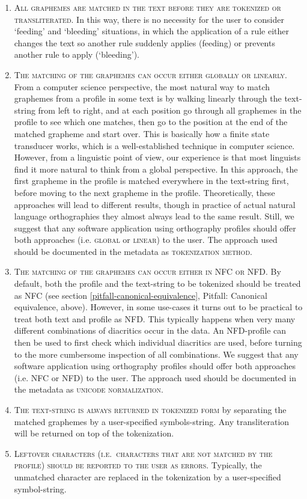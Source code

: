 \begin{enumerate}
	\def\labelenumi{\arabic{enumi}.} \item \textsc{All graphemes are matched
	in the text before they are tokenized or transliterated}. In this way,
	there is no necessity for the user to consider `feeding' and `bleeding'
	situations, in which the application of a rule either changes the text
	so another rule suddenly applies (feeding) or prevents another rule to
	apply (`bleeding').  \item \textsc{The matching of the graphemes can
	occur either globally or linearly. }From a computer science perspective,
	the most natural way to match graphemes from a profile in some text is
	by walking linearly through the text-string from left to right, and at
	each position go through all graphemes in the profile to see which one
	matches, then go to the position at the end of the matched grapheme and
	start over. This is basically how a finite state transducer works, which
	is a well-established technique in computer science. However, from a
	linguistic point of view, our experience is that most linguists find it
	more natural to think from a global perspective. In this approach, the
	first grapheme in the profile is matched everywhere in the text-string
	first, before moving to the next grapheme in the profile. Theoretically,
	these approaches will lead to different results, though in practice of
	actual natural language orthographies they almost always lead to the
	same result. Still, we suggest that any software application using
	orthography profiles should offer both approaches (i.e. \textsc{global}
	or \textsc{linear}) to the user. The approach used should be documented
	in the metadata as \textsc{tokenization method}.  \item \textsc{The
	matching of the graphemes can occur either in NFC or NFD. }By default,
	both the profile and the text-string to be tokenized should be treated
	as NFC (see section \ref{pitfall-canonical-equivalence}, Pitfall:
	Canonical equivalence, above). However, in some use-cases it turns out
	to be practical to treat both text and profile as NFD. This typically
	happens when very many different combinations of diacritics occur in the
	data. An NFD-profile can then be used to first check which individual
	diacritics are used, before turning to the more cumbersome inspection of
	all combinations. We suggest that any software application using
	orthography profiles should offer both approaches (i.e. \textsc{NFC} or
	\textsc{NFD}) to the user. The approach used should be documented in the
	metadata as \textsc{unicode normalization}.  \item \textsc{The
	text-string is always returned in tokenized form} by separating the
	matched graphemes by a user-specified symbols-string. Any
	transliteration will be returned on top of the tokenization.  \item
	\textsc{Leftover characters (i.e.~characters that are not matched by the
	profile) should be reported to the user as errors.} Typically, the
	unmatched character are replaced in the tokenization by a user-specified
	symbol-string.
\end{enumerate}

